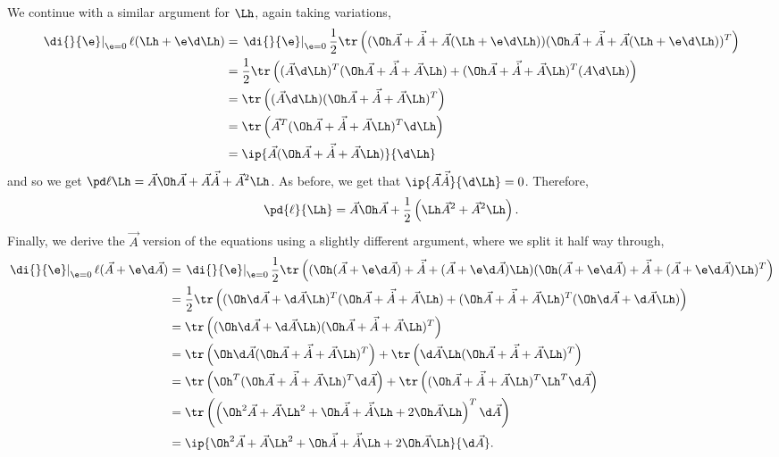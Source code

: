 \noindent
We continue with a similar argument for $\Lh$, again taking variations,
\begin{align*}
  \left.\di{}{\e}\right|_{\e = 0} \ell (\Lh + \e\d\Lh) &= \left.\di{}{\e}\right|_{\e = 0} \frac{1}{2}\tr \left( (\Oh \vec A + \vec {\dot A} + \vec A(\Lh + \e\d\Lh))(\Oh \vec A + \vec {\dot A} + \vec A(\Lh + \e\d\Lh))^T \right) \\
  &=\frac{1}{2}\tr \left( (\vec A\d \Lh)^T (\Oh\vec A + \vec{\dot A} + \vec A\Lh) + (\Oh\vec A + \vec{\dot A} + \vec A\Lh)^T (A\d\Lh) \right) \\
  &= \tr \left( (\vec A\d \Lh) (\Oh\vec A + \vec{\dot A} + \vec A\Lh)^T \right) \\
  &= \tr \left( \vec A^T (\Oh\vec A + \vec{\dot A} + \vec A\Lh)^T \d \Lh \right) \\
  &= \ip{\vec A (\Oh\vec A + \vec{\dot A} + \vec A\Lh)}{\d\Lh}
\end{align*}
and so we get $\displaystyle{\pd \ell \Lh = \vec A\Oh\vec A + \vec A\vec{\dot A} + \vec A^2\Lh}$. As before, we get that $\ip{\vec A\vec{\dot A}}{\d\Lh} = 0$. Therefore,
\begin{align}
  \pd{\ell}{\Lh} = \vec A\Oh\vec A + \frac{1}{2}\left( \Lh \vec A^2 + \vec A^2\Lh \right).
\end{align}
Finally, we derive the $\vec A$ version of the equations using a slightly different argument, where we split it half way through,
\begin{align*}
  \left.\di{}{\e}\right|_{\e = 0} \ell (\vec A + \e\d\vec A) &= \left.\di{}{\e}\right|_{\e = 0} \frac{1}{2}\tr \left( (\Oh (\vec A + \e\d\vec A) + \vec {\dot A} + (\vec A + \e\d\vec A)\Lh)(\Oh (\vec A + \e\d\vec A) + \vec {\dot A} + (\vec A + \e\d\vec A)\Lh)^T \right) \\
  &= \frac{1}{2}\tr\left( (\Oh\d\vec A + \d\vec A\Lh)^T (\Oh\vec A + \vec{\dot A} + \vec A\Lh) + (\Oh\vec A + \vec{\dot A} + \vec A\Lh)^T(\Oh\d\vec A + \d\vec A\Lh) \right) \\
  &= \tr\left( (\Oh\d\vec A + \d\vec A\Lh) (\Oh\vec A + \vec{\dot A} + \vec A\Lh)^T \right) \\
  &= \tr\left( \Oh\d\vec A(\Oh\vec A + \vec{\dot A} + \vec A\Lh)^T \right) + \tr\left( \d\vec A\Lh (\Oh\vec A + \vec{\dot A} + \vec A\Lh)^T \right)\\
  &= \tr\left( \Oh^T(\Oh\vec A + \vec{\dot A} + \vec A\Lh)^T\d\vec A \right) + \tr\left(  (\Oh\vec A + \vec{\dot A} + \vec A\Lh)^T\Lh^T\d\vec A \right)\\
  &= \tr\left( \left(\Oh^2\vec A + \vec A\Lh^2 + \Oh\vec{\dot A} + \vec{\dot A}\Lh + 2\Oh\vec A\Lh \right)^T\d\vec A \right)\\
  &= \ip{\Oh^2\vec A + \vec A\Lh^2 + \Oh\vec{\dot A} + \vec{\dot A}\Lh + 2\Oh\vec A\Lh}{\d\vec A}.
\end{align*}
